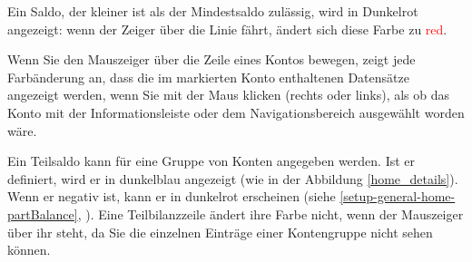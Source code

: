 Ein Saldo, der kleiner ist als der {Mindestsaldo zulässig}, wird in \textcolor[RGB]{153,0,0}{Dunkelrot} angezeigt: wenn der Zeiger über die Linie fährt, ändert sich diese Farbe zu \textcolor{red}{red}.%

Wenn Sie den Mauszeiger über die Zeile eines Kontos bewegen, zeigt jede Farbänderung an, dass die im markierten Konto enthaltenen Datensätze angezeigt werden, wenn Sie mit der Maus klicken (rechts oder links), als ob das Konto mit der Informationsleiste oder dem Navigationsbereich ausgewählt worden wäre.%

Ein Teilsaldo kann für eine Gruppe von Konten angegeben werden. Ist er definiert, wird er in \textcolor[RGB]{40,40,255}{dunkelblau} angezeigt (wie in der Abbildung \vref{home_details}). Wenn er negativ ist, kann er in \textcolor[RGB]{153,0,0}{dunkelrot} erscheinen (siehe \vref{setup-general-home-partBalance}, ). Eine Teilbilanzzeile ändert ihre Farbe nicht, wenn der Mauszeiger über ihr steht, da Sie die einzelnen Einträge einer Kontengruppe nicht sehen können.%

